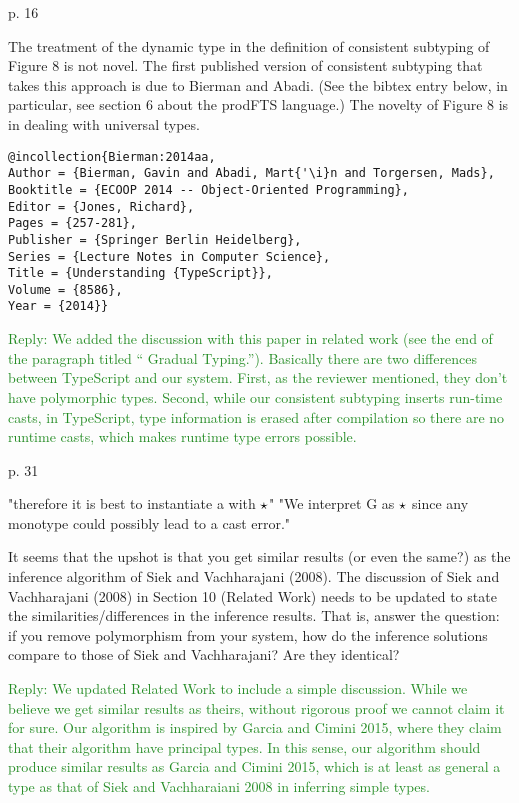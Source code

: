 \documentclass[dvipsnames]{article}
\newcommand\mynote[3]{\textcolor{#2}{#1: #3}}
\newcommand\ningning[1]{\mynote{Ningning}{orange}{#1}}
\newcommand\reply[1]{\textcolor{ForestGreen}{Reply: #1}}
\begin{document}
p. 16 

The treatment of the dynamic type in the definition of consistent subtyping of
Figure 8 is not novel. The first published version of consistent subtyping that
takes this approach is due to Bierman and Abadi. (See the bibtex entry below, in
particular, see section 6 about the prodFTS language.) The novelty of Figure 8
is in dealing with universal types.

\begin{verbatim}
@incollection{Bierman:2014aa,
Author = {Bierman, Gavin and Abadi, Mart{'\i}n and Torgersen, Mads},
Booktitle = {ECOOP 2014 -- Object-Oriented Programming},
Editor = {Jones, Richard},
Pages = {257-281},
Publisher = {Springer Berlin Heidelberg},
Series = {Lecture Notes in Computer Science},
Title = {Understanding {TypeScript}},
Volume = {8586},
Year = {2014}}
\end{verbatim}

\reply{We added the discussion with this paper in related work (see the end of
  the paragraph titled `` Gradual Typing.''). Basically there are two
differences between TypeScript and our system. First, as the reviewer mentioned,
they don't have polymorphic types. Second, while our
consistent subtyping inserts run-time casts, in TypeScript, type information is
erased after compilation so there are no runtime casts, which makes runtime type
errors possible.}


p. 31 

"therefore it is best to instantiate a with $\star$" "We interpret G as
$\star$ since any monotype could possibly lead to a cast error."

It seems that the upshot is that you get similar results (or even the same?) as
the inference algorithm of Siek and Vachharajani (2008). The discussion of Siek
and Vachharajani (2008) in Section 10 (Related Work) needs to be updated to
state the similarities/differences in the inference results. That is, answer the
question: if you remove polymorphism from your system, how do the inference
solutions compare to those of Siek and Vachharajani? Are they identical?

\reply{We updated Related Work to include a simple discussion. While we believe
  we get similar results as theirs, without rigorous proof we cannot claim it
  for sure. Our algorithm is inspired by Garcia and Cimini 2015, where they
  claim that their algorithm have principal types. In this sense, our algorithm
  should produce similar results as Garcia and Cimini 2015, which is at least as
  general a type as that of Siek and Vachharaiani 2008 in inferring simple
  types.}
\end{document}
